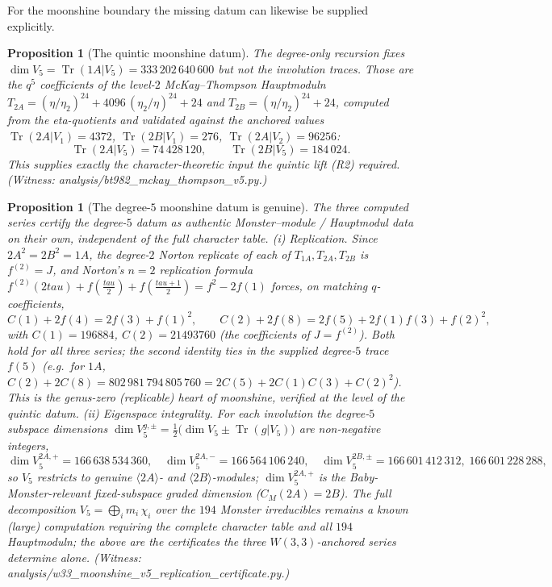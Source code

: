 \documentclass[12pt,a4paper]{article}
\def\mathbb#1{#1}%
\def\texttt#1{#1}%
\def\tau{tau}%
\def\cdot{ }%
\newtheorem{proposition}[theorem]{Proposition}
\theoremstyle{definition}
\begin{document}
For the moonshine boundary the missing datum can likewise be supplied
explicitly.

\begin{proposition}[The quintic moonshine datum]
\label{prop:v5-moonshine}
The degree-only recursion fixes $\dim V_5=\operatorname{Tr}(1A|V_5)=
333\,202\,640\,600$ but not the involution traces. Those are the $q^5$
coefficients of the level-$2$ McKay--Thompson Hauptmoduln
$T_{2A}=(\eta/\eta_2)^{24}+4096\,(\eta_2/\eta)^{24}+24$ and
$T_{2B}=(\eta/\eta_2)^{24}+24$, computed from the eta-quotients and validated
against the anchored values $\operatorname{Tr}(2A|V_1)=4372$,
$\operatorname{Tr}(2B|V_1)=276$, $\operatorname{Tr}(2A|V_2)=96256$:
\[
  \operatorname{Tr}(2A|V_5)=74\,428\,120,\qquad
  \operatorname{Tr}(2B|V_5)=184\,024 .
\]
This supplies exactly the character-theoretic input the quintic lift (R2)
required. (Witness: \texttt{analysis/bt982\_mckay\_thompson\_v5.py}.)
\end{proposition}

\begin{proposition}[The degree-$5$ moonshine datum is genuine]
\label{prop:v5-moonshine-certificate}
The three computed series certify the degree-$5$ datum as authentic
Monster--module / Hauptmodul data on their own, independent of the full
character table.
\emph{(i) Replication.} Since $2A^2=2B^2=1A$, the degree-$2$ Norton replicate of
each of $T_{1A},T_{2A},T_{2B}$ is $f^{(2)}=J$, and Norton's $n=2$ replication
formula $f^{(2)}(2\tau)+f(\tfrac{\tau}{2})+f(\tfrac{\tau+1}{2})=f^2-2f(1)$
forces, on matching $q$-coefficients,
\[
  C(1)+2f(4)=2f(3)+f(1)^2,\qquad
  C(2)+2f(8)=2f(5)+2f(1)f(3)+f(2)^2,
\]
with $C(1)=196884$, $C(2)=21493760$ (the coefficients of $J=f^{(2)}$). Both hold
for all three series; the second identity ties in the supplied degree-$5$ trace
$f(5)$ (e.g.\ for $1A$, $C(2)+2C(8)=802\,981\,794\,805\,760=2C(5)+2C(1)C(3)+C(2)^2$).
This is the genus-zero (replicable) heart of moonshine, verified at the level of
the quintic datum.
\emph{(ii) Eigenspace integrality.} For each involution the degree-$5$ subspace
dimensions $\dim V_5^{g,\pm}=\tfrac12\bigl(\dim V_5\pm\operatorname{Tr}(g|V_5)\bigr)$
are non-negative integers,
\[
  \dim V_5^{2A,+}=166\,638\,534\,360,\quad \dim V_5^{2A,-}=166\,564\,106\,240,\quad
  \dim V_5^{2B,\pm}=166\,601\,412\,312,\;166\,601\,228\,288,
\]
so $V_5$ restricts to genuine $\langle 2A\rangle$- and $\langle 2B\rangle$-modules;
$\dim V_5^{2A,+}$ is the Baby-Monster-relevant fixed-subspace graded dimension
($C_{\mathbb M}(2A)=2{\cdot}\mathbb B$). The full decomposition
$V_5=\bigoplus_i m_i\,\chi_i$ over the $194$ Monster irreducibles remains a known
(large) computation requiring the complete character table and all $194$
Hauptmoduln; the above are the certificates the three $W(3,3)$-anchored series
determine alone. (Witness:
\texttt{analysis/w33\_moonshine\_v5\_replication\_certificate.py}.)
\end{proposition}
\end{document}
